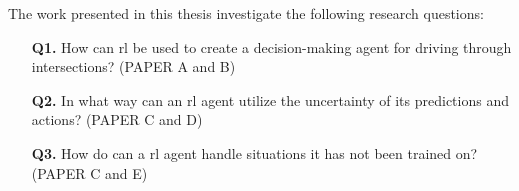 The work presented in this thesis investigate the following research questions:
\begin{enumerate}
	\item[\textbf{Q1.}] How can \gls{rl} be used to create a decision-making agent for driving through intersections? (PAPER A and B)
	\item[\textbf{Q2.}] In what way can an \gls{rl} agent utilize the uncertainty of its predictions and actions? (PAPER C and D)
	\item[\textbf{Q3.}] How do can a \gls{rl} agent handle situations it has not been trained on? (PAPER C and E)
	
\end{enumerate}

